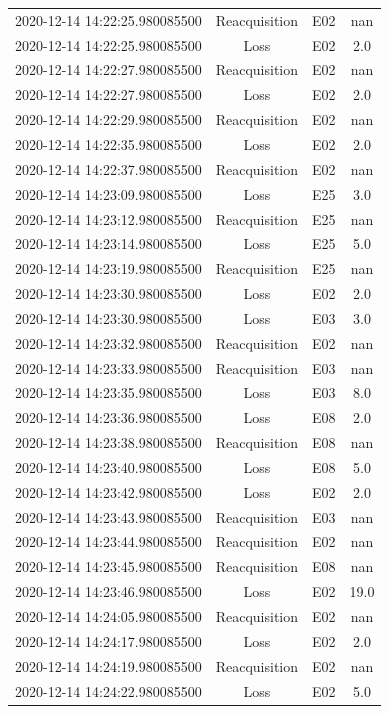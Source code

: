 \begin{enumerate}
\begin{longtabu}{cccc}
2020{-}12{-}14 14:22:25.980085500&Reacquisition&E02&nan\\%
2020{-}12{-}14 14:22:25.980085500&Loss&E02&2.0\\%
2020{-}12{-}14 14:22:27.980085500&Reacquisition&E02&nan\\%
2020{-}12{-}14 14:22:27.980085500&Loss&E02&2.0\\%
2020{-}12{-}14 14:22:29.980085500&Reacquisition&E02&nan\\%
2020{-}12{-}14 14:22:35.980085500&Loss&E02&2.0\\%
2020{-}12{-}14 14:22:37.980085500&Reacquisition&E02&nan\\%
2020{-}12{-}14 14:23:09.980085500&Loss&E25&3.0\\%
2020{-}12{-}14 14:23:12.980085500&Reacquisition&E25&nan\\%
2020{-}12{-}14 14:23:14.980085500&Loss&E25&5.0\\%
2020{-}12{-}14 14:23:19.980085500&Reacquisition&E25&nan\\%
2020{-}12{-}14 14:23:30.980085500&Loss&E02&2.0\\%
2020{-}12{-}14 14:23:30.980085500&Loss&E03&3.0\\%
2020{-}12{-}14 14:23:32.980085500&Reacquisition&E02&nan\\%
2020{-}12{-}14 14:23:33.980085500&Reacquisition&E03&nan\\%
2020{-}12{-}14 14:23:35.980085500&Loss&E03&8.0\\%
2020{-}12{-}14 14:23:36.980085500&Loss&E08&2.0\\%
2020{-}12{-}14 14:23:38.980085500&Reacquisition&E08&nan\\%
2020{-}12{-}14 14:23:40.980085500&Loss&E08&5.0\\%
2020{-}12{-}14 14:23:42.980085500&Loss&E02&2.0\\%
2020{-}12{-}14 14:23:43.980085500&Reacquisition&E03&nan\\%
2020{-}12{-}14 14:23:44.980085500&Reacquisition&E02&nan\\%
2020{-}12{-}14 14:23:45.980085500&Reacquisition&E08&nan\\%
2020{-}12{-}14 14:23:46.980085500&Loss&E02&19.0\\%
2020{-}12{-}14 14:24:05.980085500&Reacquisition&E02&nan\\%
2020{-}12{-}14 14:24:17.980085500&Loss&E02&2.0\\%
2020{-}12{-}14 14:24:19.980085500&Reacquisition&E02&nan\\%
2020{-}12{-}14 14:24:22.980085500&Loss&E02&5.0\\%

\end{longtabu}
\end{enumerate}

